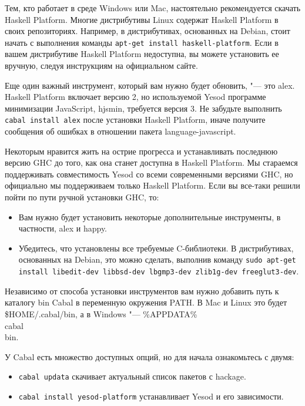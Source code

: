 Тем, кто работает в среде Windows или Mac, настоятельно рекомендуется скачать Haskell Platform. Многие дистрибутивы Linux содержат Haskell Platform в своих репозиториях. Например, в дистрибутивах, основанных на Debian, стоит начать с выполнения команды \lstinline'apt-get install haskell-platform'. Если в вашем дистрибутиве Haskell Platform недоступна, вы можете установить ее вручную, следуя инструкциям на официальном сайте.

Еще один важный инструмент, который вам нужно будет обновить, "--- это alex. Haskell Platform включает версию 2, но используемой Yesod программе минимизации JavaScript, hjsmin, требуется версия 3. Не забудьте выполнить \lstinline'cabal install alex' после установки Haskell Platform, иначе получите сообщения об ошибках в отношении пакета language-javascript.

Некоторым нравится жить на острие прогресса и устанавливать последнюю версию GHC до того, как она станет доступна в Haskell Platform. Мы стараемся поддерживать совместимость Yesod со всеми современными версиями GHC, но официально мы поддерживаем только Haskell Platform. Если вы все-таки решили пойти по пути ручной установки GHC, то:

\begin{itemize}
  \item Вам нужно будет установить некоторые дополнительные инструменты, в частности, alex и happy.
  \item Убедитесь, что установлены все требуемые C-библиотеки. В дистрибутивах, основанных на Debian, это можно сделать, выполнив команду \lstinline'sudo apt-get install libedit-dev libbsd-dev lbgmp3-dev zlib1g-dev freeglut3-dev'.
\end{itemize}

Независимо от способа установки инструментов вам нужно добавить путь к каталогу bin Cabal в переменную окружения PATH. В Mac и Linux это будет \$HOME/.cabal/bin, а в Windows "--- \%APPDATA\%\\cabal\\bin.

У Cabal есть множество доступных опций, но для начала ознакомьтесь с двумя:

\begin{itemize}
  \item \lstinline'cabal updata' скачивает актуальный список пакетов с hackage.
  \item \lstinline'cabal install yesod-platform' устанавливает Yesod и его зависимости.
\end{itemize}

